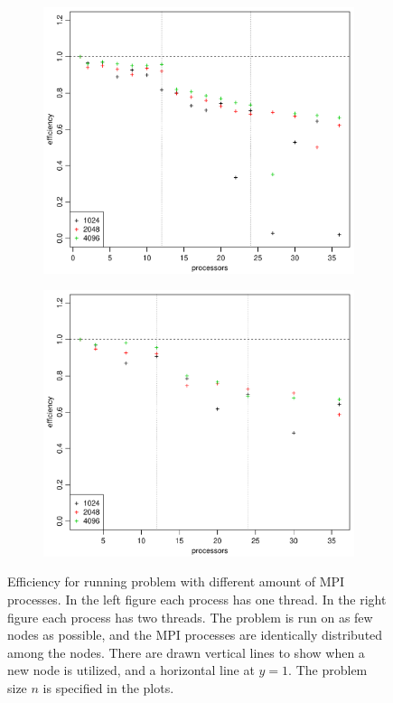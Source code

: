 \begin{figure}[h!]
  \centering
  \begin{subfigure}[b]{0.48\textwidth}
    \includegraphics[width=\textwidth]{./Figures/taskbEfficiencyProc1.pdf}
  \end{subfigure}%
  \quad
  \begin{subfigure}[b]{0.48\textwidth}
    \includegraphics[width=\textwidth]{./Figures/taskbEfficiencyProc2.pdf}
  \end{subfigure}
  \vspace{-0.1\baselineskip}
	\caption{Efficiency for running problem with different amount of MPI processes. In the left figure each process has one thread. In the right figure each process has two threads. The problem is run on as few nodes as possible, and the MPI processes are identically distributed among the nodes. There are drawn vertical lines to show when a new node is utilized, and a horizontal line at $y=1$. The problem size $n$ is specified in the plots.} 
  \label{fig:Efficiency}
\end{figure}
